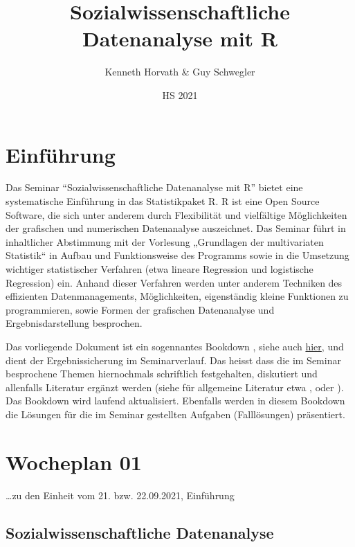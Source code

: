 \documentclass[
]{book}
\title{Sozialwissenschaftliche Datenanalyse mit R}
\author{Kenneth Horvath \& Guy Schwegler}
\date{HS 2021}
\begin{document}
\maketitle

{
\setcounter{tocdepth}{1}
\tableofcontents
}
\hypertarget{einfuxfchrung}{%
\chapter*{Einführung}\label{einfuxfchrung}}

Das Seminar ``Sozialwissenschaftliche Datenanalyse mit R'' bietet eine systematische Einführung in das Statistikpaket R. R ist eine Open Source Software, die sich unter anderem durch Flexibilität und vielfältige Möglichkeiten der grafischen und numerischen Datenanalyse auszeichnet. Das Seminar führt in inhaltlicher Abstimmung mit der Vorlesung „Grundlagen der multivariaten Statistik`` in Aufbau und Funktionsweise des Programms sowie in die Umsetzung wichtiger statistischer Verfahren (etwa lineare Regression und logistische Regression) ein. Anhand dieser Verfahren werden unter anderem Techniken des effizienten Datenmanagements, Möglichkeiten, eigenständig kleine Funktionen zu programmieren, sowie Formen der grafischen Datenanalyse und Ergebnisdarstellung besprochen.

Das vorliegende Dokument ist ein sogennantes Bookdown \citep{R-bookdown}, siehe auch \href{https://bookdown.org/}{hier}, und dient der Ergebnissicherung im Seminarverlauf. Das heisst dass die im Seminar besprochene Themen hiernochmals schriftlich festgehalten, diskutiert und allenfalls Literatur ergänzt werden (siehe für allgemeine Literatur etwa \citet{DiazBone2019}, \citet{Kabacoff2015} oder \citet{Manderscheid2017}). Das Bookdown wird laufend aktualisiert. Ebenfalls werden in diesem Bookdown die Lösungen für die im Seminar gestellten Aufgaben (Falllösungen) präsentiert.

\hypertarget{wocheplan-01}{%
\chapter{Wocheplan 01}\label{wocheplan-01}}

\ldots zu den Einheit vom 21. bzw. 22.09.2021, Einführung

\hypertarget{sozialwissenschaftliche-datenanalyse}{%
\section{Sozialwissenschaftliche Datenanalyse}\label{sozialwissenschaftliche-datenanalyse}}
\end{document}
